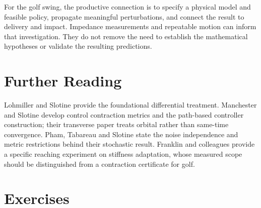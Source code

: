 For the golf swing, the productive connection is to specify a physical model and feasible policy, propagate meaningful perturbations, and connect the result to delivery and impact. Impedance measurements and repeatable motion can inform that investigation. They do not remove the need to establish the mathematical hypotheses or validate the resulting predictions.

\section{Further Reading}

Lohmiller and Slotine \cite{LohmillerSlotine1998} provide the foundational differential treatment. Manchester and Slotine \cite{ManchesterSlotine2017} develop control contraction metrics and the path-based controller construction; their transverse paper \cite{ManchesterSlotineTransverse2013} treats orbital rather than same-time convergence. Pham, Tabareau and Slotine \cite{PhamTabuadaSlotine2009} state the noise independence and metric restrictions behind their stochastic result. Franklin and colleagues \cite{Franklin2003Stiffness} provide a specific reaching experiment on stiffness adaptation, whose measured scope should be distinguished from a contraction certificate for golf.

\section*{Exercises}

